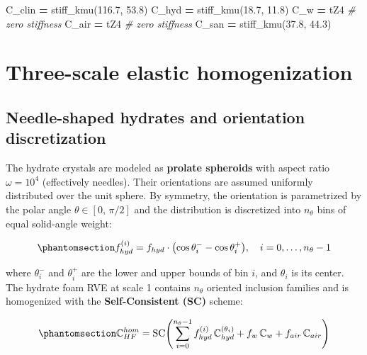 \documentclass[
  a4paper,
  numbers=noendperiod,
  DIV=12]{scrreprt}
\newenvironment{Shaded}{\begin{snugshade}}{\end{snugshade}}
\newcommand{\CommentTok}[1]{\textcolor[rgb]{0.56,0.35,0.01}{\textit{#1}}}
\newcommand{\FloatTok}[1]{\textcolor[rgb]{0.00,0.00,0.81}{#1}}
\newcommand{\NormalTok}[1]{#1}
\newcommand{\OperatorTok}[1]{\textcolor[rgb]{0.81,0.36,0.00}{\textbf{#1}}}
\begin{document}
\begin{Shaded}
\begin{Highlighting}[]
\NormalTok{C\_clin }\OperatorTok{=}\NormalTok{ stiff\_kmu(}\FloatTok{116.7}\NormalTok{, }\FloatTok{53.8}\NormalTok{)}
\NormalTok{C\_hyd  }\OperatorTok{=}\NormalTok{ stiff\_kmu(}\FloatTok{18.7}\NormalTok{, }\FloatTok{11.8}\NormalTok{)}
\NormalTok{C\_w    }\OperatorTok{=}\NormalTok{ tZ4                      }\CommentTok{\# zero stiffness}
\NormalTok{C\_air  }\OperatorTok{=}\NormalTok{ tZ4                      }\CommentTok{\# zero stiffness}
\NormalTok{C\_san  }\OperatorTok{=}\NormalTok{ stiff\_kmu(}\FloatTok{37.8}\NormalTok{, }\FloatTok{44.3}\NormalTok{)}
\end{Highlighting}
\end{Shaded}

\section{Three-scale elastic homogenization}\label{sec-pichler-elas}

\subsection{Needle-shaped hydrates and orientation
discretization}\label{sec-needle-orient}

The hydrate crystals are modeled as \textbf{prolate spheroids} with
aspect ratio \(\omega = 10^4\) (effectively needles). Their orientations
are assumed uniformly distributed over the unit sphere. By symmetry, the
orientation is parametrized by the polar angle
\(\theta \in [0,\, \pi/2]\) and the distribution is discretized into
\(n_\theta\) bins of equal solid-angle weight:

\begin{equation}\protect\phantomsection\label{eq-orient-weight}{
f_{hyd}^{(i)} = f_{hyd} \cdot \bigl(\cos\theta_i^- - \cos\theta_i^+\bigr), \quad i = 0,\dots, n_\theta-1
}\end{equation}

where \(\theta_i^-\) and \(\theta_i^+\) are the lower and upper bounds
of bin \(i\), and \(\theta_i\) is its center. The hydrate foam RVE at
scale 1 contains \(n_\theta\) oriented inclusion families and is
homogenized with the \textbf{Self-Consistent (SC)} scheme:

\begin{equation}\protect\phantomsection\label{eq-sc-hf}{
\mathbb{C}^{hom}_{HF} = \mathrm{SC}\!\left(\sum_{i=0}^{n_\theta-1} f_{hyd}^{(i)}\,\mathbb{C}_{hyd}^{(\theta_i)}
                            + f_w\,\mathbb{C}_w + f_{air}\,\mathbb{C}_{air}\right)
}\end{equation}
\end{document}
